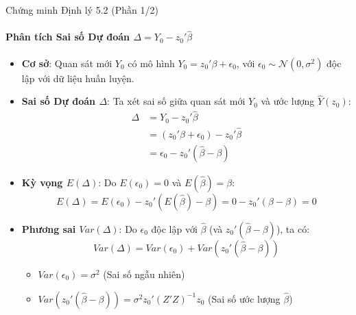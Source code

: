 \begin{frame}{Chứng minh Định lý 5.2 (Phần 1/2)}
    \framesubtitle{Phân tích Sai số Dự đoán $\Delta = Y_0 - z_0'\hat{\beta}$}

    \begin{itemize}
        \item \textbf{Cơ sở}: Quan sát mới $Y_0$ có mô hình $Y_0 = z_0'\beta + \epsilon_0$, với $\epsilon_0 \sim \mathcal{N}(0, \sigma^2)$ độc lập với dữ liệu huấn luyện.
        \item \textbf{Sai số Dự đoán $\Delta$}: Ta xét sai số giữa quan sát mới $Y_0$ và ước lượng $\hat{Y}(z_0)$:
        \begin{align*}
            \Delta &= Y_0 - z_0'\hat{\beta} \\
            &= (z_0'\beta + \epsilon_0) - z_0'\hat{\beta} \\
            &= \epsilon_0 - z_0'(\hat{\beta} - \beta) 
        \end{align*}
        
           \item \textbf{Kỳ vọng $E(\Delta)$}: Do $E(\epsilon_0)=0$ và $E(\hat{\beta})=\beta$:
        \[
            E(\Delta) = E(\epsilon_0) - z_0'(E(\hat{\beta}) - \beta) = 0 - z_0'(\beta - \beta) = 0
        \]

        \item \textbf{Phương sai $Var(\Delta)$}: Do $\epsilon_0$ độc lập với $\hat{\beta}$ (và $z_0'(\hat{\beta}-\beta)$), ta có:
        \[
            Var(\Delta) = Var(\epsilon_0) + Var(z_0'(\hat{\beta} - \beta))
        \]
        \begin{itemize}
            \item $Var(\epsilon_0) = \sigma^2$ (Sai số ngẫu nhiên)
            \item $Var(z_0'(\hat{\beta}-\beta)) = \sigma^2 z_0'(Z'Z)^{-1}z_0$ (Sai số ước lượng $\hat{\beta}$)
        \end{itemize}
    \end{itemize}
\end{frame}
